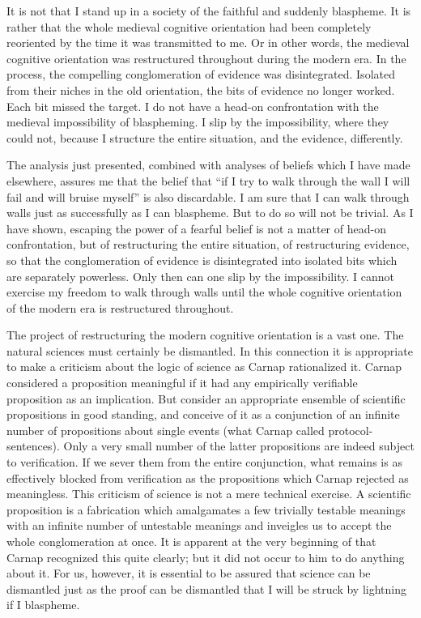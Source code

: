 It is not that I stand up in a society of the faithful and suddenly blaspheme. It is rather that the whole medieval cognitive orientation had been completely reoriented by the time it was transmitted to me. Or in other words, the medieval cognitive orientation was restructured throughout during the modern era. In the process, the compelling conglomeration of evidence was disintegrated. Isolated from their niches in the old orientation, the bits of evidence no longer worked. Each bit missed the target. I do not have a head-on confrontation with the medieval impossibility of blaspheming. I slip by the impossibility, where they could not, because I structure the entire situation, and the evidence, differently. 

The analysis just presented, combined with analyses of beliefs which I have made elsewhere, assures me that the belief that \enquote{if I try to walk through the wall I will fail and will bruise myself} is also discardable. I am sure that I can walk through walls just as successfully as I can blaspheme. But to do so will not be trivial. As I have shown, escaping the power of a fearful belief is not a matter of head-on confrontation, but of restructuring the entire situation, of restructuring evidence, so that the conglomeration of evidence is disintegrated into isolated bits which are separately powerless. Only then can one slip by the impossibility. I cannot exercise my freedom to walk through walls until the whole cognitive orientation of the modern era is restructured throughout. 

The project of restructuring the modern cognitive orientation is a vast one. The natural sciences must certainly be dismantled. In this connection it is appropriate to make a criticism about the logic of science as Carnap rationalized it. Carnap considered a proposition meaningful if it had any empirically verifiable proposition as an implication. But consider an appropriate ensemble of scientific propositions in good standing, and conceive of it as a conjunction of an infinite number of propositions about single events (what Carnap called protocol-sentences). Only a very small number of the latter propositions are indeed subject to verification. If we sever them from the entire conjunction, what remains is as effectively blocked from verification as the propositions which Carnap rejected as meaningless. This criticism of science is not a mere technical exercise. A scientific proposition is a fabrication which amalgamates a few trivially testable meanings with an infinite number of untestable meanings and inveigles us to accept the whole conglomeration at once. It is apparent at the very beginning of  that Carnap recognized this quite clearly; but it did not occur to him to do anything about it. For us, however, it is essential to be assured that science can be dismantled just as the proof can be dismantled that I will be struck by lightning if I blaspheme. 

